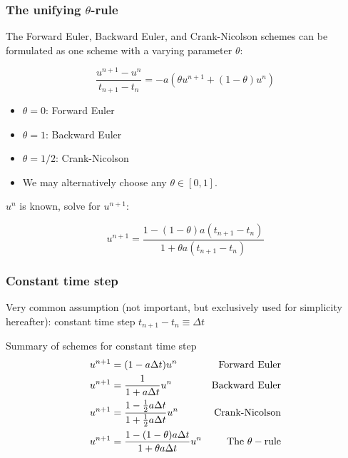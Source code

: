 \documentclass{beamer}
\begin{document}
\begin{frame}
\frametitle{The unifying $\theta$-rule}

\label{decay:schemes:theta}

  

The Forward Euler, Backward Euler, and Crank-Nicolson schemes can be
formulated as one scheme with a varying parameter $\theta$:

\begin{equation}
\frac{u^{n+1}-u^{n}}{t_{n+1}-t_n} = -a (\theta u^{n+1} + (1-\theta) u^{n})
\label{decay:th0}
\end{equation}

\begin{itemize}
 \item $\theta =0$: Forward Euler

 \item $\theta =1$: Backward Euler

 \item $\theta =1/2$: Crank-Nicolson

 \item We may alternatively choose any $\theta\in [0,1]$.
\end{itemize}

\noindent
$u^n$ is known, solve for $u^{n+1}$:

\begin{equation}
u^{n+1} = \frac{1 - (1-\theta) a(t_{n+1}-t_n)}{1 + \theta a(t_{n+1}-t_n)}
\label{decay:th}
\end{equation}
\end{frame}

\begin{frame}
\frametitle{Constant time step}

Very common assumption (not important, but exclusively used for
simplicity hereafter): constant time step $t_{n+1}-t_n\equiv\Delta t$


\begin{block}{Summary of schemes for constant time step }
\begin{alignat}{2}
u^{n+1} &= (1 - a\Delta t )u^n  & \hbox{Forward Euler}
\label{decay:FE:u}\\ 
u^{n+1} &= \frac{1}{1+ a\Delta t} u^n  & \hbox{Backward Euler}
\label{decay:BE:u}\\ 
u^{n+1} &= \frac{1-\frac{1}{2} a\Delta t}{1 + \frac{1}{2} a\Delta t} u^n & \hbox{Crank-Nicolson}
\label{decay:CN:u}\\ 
u^{n+1} &= \frac{1 - (1-\theta) a\Delta t}{1 + \theta a \Delta t}u^n  & \hbox{The }\theta-\hbox{rule}
\label{decay:th:u}
\end{alignat}
\end{block}
\end{frame}
\end{document}
